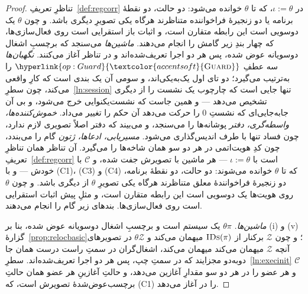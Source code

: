 \documentclass[10pt,oneside,openany]{book}
\newcommand{\Corr}{\mathcal{C}}
\newcommand{\Zenv}{\mathcal{Z}}
\newcommand{\op}[1]{\textnormal{\textsc{#1}}}
\newcommand{\opl}[1]{\hyperlink{op:#1}{\textcolor{accentsoft}{\op{#1}}}}
\newcommand{\IDs}{\op{IDs}}
\theoremstyle{accentdef}
\theoremstyle{accentplain}
\begin{document}
\begin{proof}
تناظرِ تعریفِ~\ref{def:regcorr} در $\iota := \theta$، که تا $\theta$
خوانده می‌شود: دو حالت، دو نقطهٔ برنامه یا دو زنجیرهٔ فراخواننده متناظرند
هرگاه یکی تصویرِ دیگری باشد. و چون $\theta$ یک دوسویی است این رابطه متقارن
است، و اثبات باز استقرایی است روی فعال‌سازی‌ها، که چهار بندِ زیر گامش را
انجام می‌دهند. \emph{ماشین‌ها} می‌سنجد که برچسبِ اشغال دوسویانه عوض شده،
پس هر دو اجرا تعریف‌شده‌اند و در تناظر آغاز می‌کنند. \emph{نگهبان‌ها} سه
عطفِ $\opl{Guard}$ را به‌ترتیب می‌گیرد؛ دو تای اول یک‌به‌یکی‌اند، و سومی آن
یک بندی است که کارِ واقعی می‌کند، چون سطرِ~\ref{ln:session} تنها جایی است
که چارچوب یک نشست را از دیگری تشخیص می‌دهد --- و همین جاست که
نشست‌یکنوایی خرج می‌شود، و بی آن جابه‌جایی‌ای که نشستِ $0$ را حرکت می‌دهد
آن حکم را تغییر می‌داد. \emph{خموش‌کننده‌ها، واسطه‌گری، دفتر} پوشانه‌ها را
می‌سنجد، و می‌بیند که دفتر اصلاً تصویری لازم ندارد، چون فساد تنها با طرف
اندیس‌گذاری می‌شود. \emph{مسیریابی، ادعاها، ژتون} گام را می‌بندد، چون کدِ
هویت‌اتمی در هر دو سو همان شاخه‌ها را می‌گیرد.
آن تناظر همان تناظرِ تعریفِ~\ref{def:regcorr} است با $\iota := \theta$ ---
هر ماشین با تصویرش جفت شده، و $\Corr$ با خودش --- و با (C1)، (C3) و (C4)
که تا $\theta$ خوانده می‌شوند: دو حالت، دو نقطهٔ برنامه، دو زنجیرهٔ
فراخوانندهٔ معلق متناظرند هرگاه یکی تصویرِ $\theta$ از دیگری باشد. و چون
$\theta$ روی هویت‌ها یک دوسویی است این رابطه متقارن است، و مثلِ پیش اثبات
استقرایی است روی فعال‌سازی‌ها. بندهای زیر گام را انجام می‌دهند.

\emph{ماشین‌ها.} $\theta\pi$ یک سیستم است و برچسبِ اشغال دوسویانه عوض شده،
بنا بر (i) و (v)ِ گزارهٔ~\ref{prop:relocbasic}؛ و چون $\Zenv$ برکنار از
$\IDs(\pi)$ میهمان می‌کند و $\theta\Zenv$ در تصویرهای آنچه $\Zenv$ میهمان
می‌کند میهمان می‌کند، اشغال‌گران در سمتِ راست درست همان جا دوبه‌دو مجزایند
که در سمتِ چپ، پس هر دو اجرا تعریف‌شده‌اند. سطرِ~\ref{ln:execinit} $\Corr$
و هر عضو را در هر دو سو مقدارِ آغازین می‌دهد، و حالتِ آغازینِ هر عضو همان
حالتِ برچسب‌عوض‌شدهٔ تصویرش است، که (C1) را در آغاز می‌دهد.


\end{proof}
\end{document}
